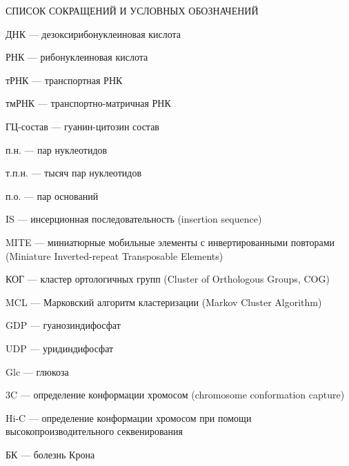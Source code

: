 \printnomenclature[3.5cm] %
СПИСОК СОКРАЩЕНИЙ И УСЛОВНЫХ ОБОЗНАЧЕНИЙ

ДНК --- дезоксирибонуклеиновая кислота

РНК --- рибонуклеиновая кислота

тРНК --- транспортная РНК

тмРНК --- транспортно-­матричная РНК

ГЦ-состав --- гуанин-цитозин состав

п.н. ---  пар нуклеотидов

т.п.н. ---  тысяч пар нуклеотидов

п.о. --- пар оснований

IS --- инсерционная последовательность (insertion sequence)

MITE --- миниатюрные мобильные элементы с инвертированными повторами (Miniature Inverted-repeat Transposable Elements)

КОГ --- кластер ортологичных групп (Cluster of Orthologous Groups, COG)

MCL --- Марковский алгоритм кластеризации (Markov Cluster Algorithm)

GDP --- гуанозиндифосфат

UDP --- уридиндифосфат

Glc --- глюкоза

3C --- определение конформации хромосом (chromosome conformation capture)

Hi-C --- определение конформации хромосом при помощи высокопроизводительного секвенирования

БК --- болезнь Крона

